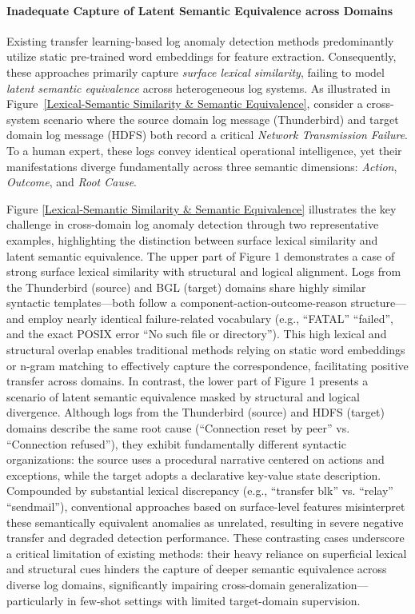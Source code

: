 \documentclass[lettersize,journal]{IEEEtran}
\begin{document}
\paragraph{Inadequate Capture of Latent Semantic Equivalence across Domains}
Existing transfer learning-based log anomaly detection methods predominantly utilize static pre-trained word embeddings for feature extraction. Consequently, these approaches primarily capture \textit{surface lexical similarity}, failing to model \textit{latent semantic equivalence} across heterogeneous log systems. As illustrated in Figure~\ref{Lexical-Semantic Similarity & Semantic Equivalence}, consider a cross-system scenario where the source domain log message (Thunderbird) and target domain log message (HDFS) both record a critical \textit{Network Transmission Failure}. To a human expert, these logs convey identical operational intelligence, yet their manifestations diverge fundamentally across three semantic dimensions: \textit{Action}, \textit{Outcome}, and \textit{Root Cause}.

Figure \ref{Lexical-Semantic Similarity & Semantic Equivalence} illustrates the key challenge in cross-domain log anomaly detection through two representative examples, highlighting the distinction between surface lexical similarity and latent semantic equivalence.
The upper part of Figure 1 demonstrates a case of strong surface lexical similarity with structural and logical alignment. Logs from the Thunderbird (source) and BGL (target) domains share highly similar syntactic templates—both follow a component-action-outcome-reason structure—and employ nearly identical failure-related vocabulary (e.g., ``FATAL'' ``failed'', and the exact POSIX error ``No such file or directory''). This high lexical and structural overlap enables traditional methods relying on static word embeddings or n-gram matching to effectively capture the correspondence, facilitating positive transfer across domains.
In contrast, the lower part of Figure 1 presents a scenario of latent semantic equivalence masked by structural and logical divergence. Although logs from the Thunderbird (source) and HDFS (target) domains describe the same root cause (``Connection reset by peer'' vs. ``Connection refused''), they exhibit fundamentally different syntactic organizations: the source uses a procedural narrative centered on actions and exceptions, while the target adopts a declarative key-value state description. Compounded by substantial lexical discrepancy (e.g., ``transfer blk'' vs. ``relay'' ``sendmail''), conventional approaches based on surface-level features misinterpret these semantically equivalent anomalies as unrelated, resulting in severe negative transfer and degraded detection performance.
These contrasting cases underscore a critical limitation of existing methods: their heavy reliance on superficial lexical and structural cues hinders the capture of deeper semantic equivalence across diverse log domains, significantly impairing cross-domain generalization—particularly in few-shot settings with limited target-domain supervision.
\end{document}
